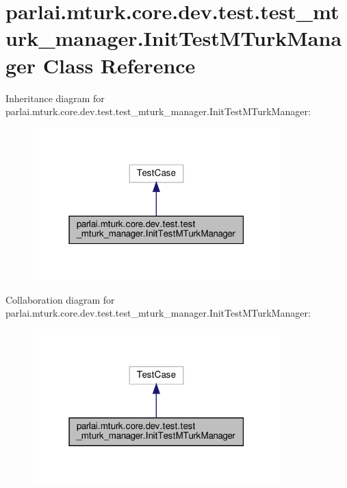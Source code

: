 \hypertarget{classparlai_1_1mturk_1_1core_1_1dev_1_1test_1_1test__mturk__manager_1_1InitTestMTurkManager}{}\section{parlai.\+mturk.\+core.\+dev.\+test.\+test\+\_\+mturk\+\_\+manager.\+Init\+Test\+M\+Turk\+Manager Class Reference}
\label{classparlai_1_1mturk_1_1core_1_1dev_1_1test_1_1test__mturk__manager_1_1InitTestMTurkManager}


Inheritance diagram for parlai.\+mturk.\+core.\+dev.\+test.\+test\+\_\+mturk\+\_\+manager.\+Init\+Test\+M\+Turk\+Manager\+:\nopagebreak
\begin{figure}[H]
\begin{center}
\leavevmode
\includegraphics[width=271pt]{df/d85/classparlai_1_1mturk_1_1core_1_1dev_1_1test_1_1test__mturk__manager_1_1InitTestMTurkManager__inherit__graph}
\end{center}
\end{figure}


Collaboration diagram for parlai.\+mturk.\+core.\+dev.\+test.\+test\+\_\+mturk\+\_\+manager.\+Init\+Test\+M\+Turk\+Manager\+:\nopagebreak
\begin{figure}[H]
\begin{center}
\leavevmode
\includegraphics[width=271pt]{d2/d3d/classparlai_1_1mturk_1_1core_1_1dev_1_1test_1_1test__mturk__manager_1_1InitTestMTurkManager__coll__graph}
\end{center}
\end{figure}
